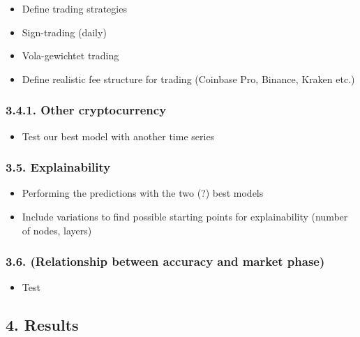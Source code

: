 \documentclass[
]{article}
\providecommand{\tightlist}{%
  \setlength{\itemsep}{0pt}\setlength{\parskip}{0pt}}
\begin{document}
\begin{itemize}
\item
  Define trading strategies
\item
  Sign-trading (daily)
\item
  Vola-gewichtet trading
\item
  Define realistic fee structure for trading (Coinbase Pro, Binance,
  Kraken etc.)
\end{itemize}

\hypertarget{other-cryptocurrency}{%
\subsubsection{3.4.1. Other cryptocurrency}\label{other-cryptocurrency}}

\begin{itemize}
\tightlist
\item
  Test our best model with another time series
\end{itemize}

\hypertarget{explainability}{%
\subsubsection{3.5. Explainability}\label{explainability}}

\begin{itemize}
\item
  Performing the predictions with the two (?) best models
\item
  Include variations to find possible starting points for explainability
  (number of nodes, layers)
\end{itemize}

\hypertarget{relationship-between-accuracy-and-market-phase}{%
\subsubsection{3.6. (Relationship between accuracy and market
phase)}\label{relationship-between-accuracy-and-market-phase}}

\begin{itemize}
\tightlist
\item
  Test
\end{itemize}

\newpage

\hypertarget{results}{%
\subsection{4. Results}\label{results}}
\end{document}
